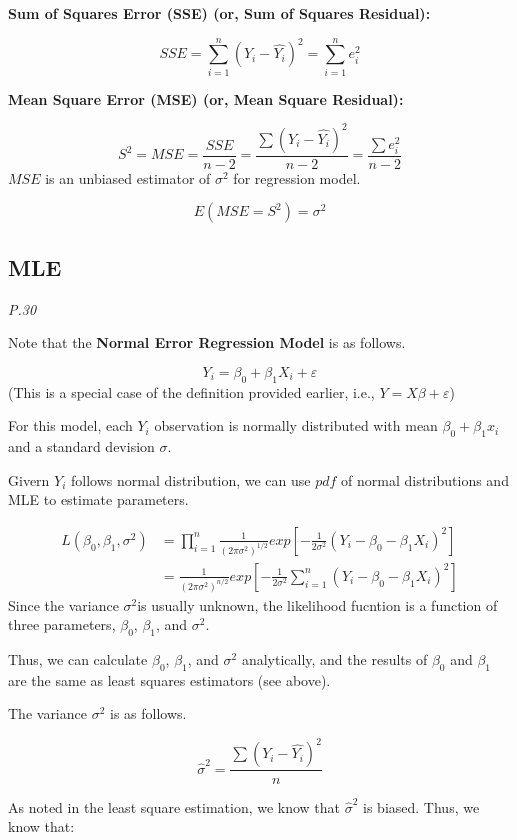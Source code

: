 \documentclass[]{book}
\begin{document}
\textbf{Sum of Squares Error (SSE) (or, Sum of Squares Residual): }

\[SSE=\sum_{i=1}^n (Y_i-\hat{Y_i})^2=\sum_{i=1}^n e_i^2\]

\textbf{Mean Square Error (MSE) (or, Mean Square Residual):}

\[S^2=MSE=\frac{SSE}{n-2}=\frac{\sum(Y_i-\hat{Y_i})^2}{n-2}=\frac{\sum e_i^2}{n-2}\]
\(MSE\) is an unbiased estimator of \(\sigma^2\) for regression model.

\[E(MSE=S^2)=\sigma^2\]

\hypertarget{mle}{%
\subsection{MLE}\label{mle}}

\emph{P.30}

Note that the \textbf{Normal Error Regression Model} is as follows.

\[Y_i=\beta_0+\beta_1X_i +\varepsilon\]
(This is a special case of the definition provided earlier, i.e., \(Y=X\beta +\varepsilon\))

For this model, each \(Y_i\) observation is normally distributed with mean \(\beta_0+\beta_1x_i\) and a standard devision \(\sigma\).

Givern \(Y_i\) follows normal distribution, we can use \(pdf\) of normal distributions and MLE to estimate parameters.

\[\begin{aligned} L(\beta_0,\beta_1,\sigma^2) &=\prod_{i=1}^n \frac{1}{(2\pi \sigma^2)^{1/2}}exp[-\frac{1}{2 \sigma^2}(Y_i-\beta_0-\beta_1X_i)^2] \\ &=\frac{1}{(2\pi \sigma^2)^{n/2}}exp[-\frac{1}{2 \sigma^2}\sum_{i=1}^n(Y_i-\beta_0-\beta_1X_i)^2]  \end{aligned}\]
Since the variance \(\sigma^2\)is usually unknown, the likelihood fucntion is a function of three parameters, \(\beta_0\), \(\beta_1\), and \(\sigma^2\).

Thus, we can calculate \(\beta_0\), \(\beta_1\), and \(\sigma^2\) analytically, and the results of \(\beta_0\) and \(\beta_1\) are the same as least squares estimators (see above).

The variance \(\sigma^2\) is as follows.

\[\hat{\sigma}^2=\frac{\sum(Y_i-\hat{Y_i})^2}{n}\]

As noted in the least square estimation, we know that \(\hat{\sigma}^2\) is biased. Thus, we know that:
\end{document}
